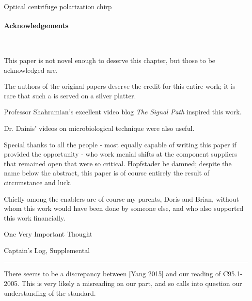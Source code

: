 \documentclass[fleqn,10pt]{article}
\begin{document}
\begin{multicols}{1}
\clearpage
{\Large Optical centrifuge polarization chirp}\\
\begin{multicols}{1}







\end{multicols}







\clearpage
\paragraph{Acknowledgements}\

This paper is not novel enough to deserve this chapter, but those to be acknowledged are.

The authors of the original papers deserve the credit for this entire work; it is rare that such a is served on a silver platter.

Professor Shahramian's excellent video blog {\it The Signal Path} inspired this work. 

Dr. Dainis' videos on microbiological technique were also useful.

Special thanks to all the people - most equally capable of writing this paper if provided the opportunity - who work menial shifts at the component suppliers that remained open that were so critical. Hopfstader be damned; despite the name below the abstract, this paper is of course entirely the result of circumstance and luck. 

Chiefly among the enablers are of course my parents, Doris and Brian, without whom this work would have been done by someone else, and who also supported this work financially. 



One Very Important Thought


\clearpage

{\Large Captain's Log, Supplemental}\\


\rule{\linewidth}{0.2pt}

There seems to be a discrepancy between [Yang 2015] and our reading of C95.1-2005. This is very likely a misreading on our part, and so calls into question our understanding of the standard.


\end{multicols}
\end{document}
